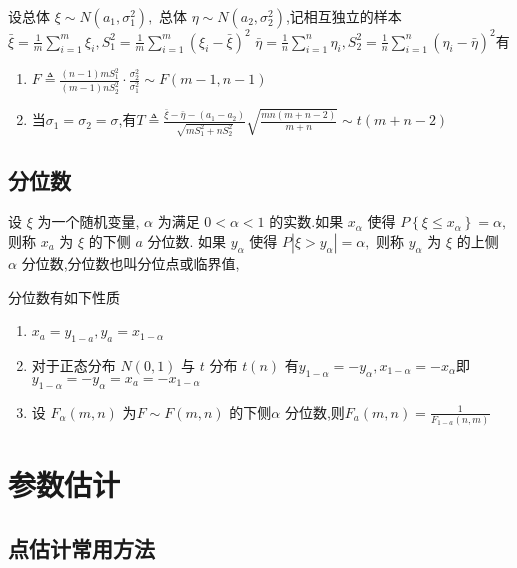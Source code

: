 \documentclass[10pt]{yerbaformat}
\begin{document}
\begin{theorem}
    设总体 $\xi \sim N\left(a_{1}, \sigma_{1}^{2}\right),$ 总体 $\eta \sim N\left(a_{2}, \sigma_{2}^{2}\right)$,记相互独立的样本$\bar{\xi}=\frac{1}{m} \sum_{i=1}^{m} \xi_{i}, S_{1}^{2}=\frac{1}{m} \sum_{i=1}^{m}\left(\xi_{i}-\bar{\xi}\right)^{2}$
    $\bar{\eta}=\frac{1}{n} \sum_{i=1}^{n} \eta_{i}, S_{2}^{2}=\frac{1}{n} \sum_{i=1}^{n}\left(\eta_{i}-\bar{\eta}\right)^{2}$有
    \begin{enumerate}
        \item $F \triangleq \frac{(n-1) m S_{1}^{2}}{(m-1) n S_{2}^{2}} \cdot \frac{\sigma_{2}^{2}}{\sigma_{1}^{2}} \sim F(m-1, n-1)$
        \item 当$\sigma_{1}=\sigma_{2}=\sigma$,有$T \triangleq \frac{\bar{\xi}-\bar{\eta}-\left(a_{1}-a_{2}\right)}{\sqrt{m S_{1}^{2}+n S_{2}^{2}}} \sqrt{\frac{m n(m+n-2)}{m+n}} \sim t(m+n-2)$
    \end{enumerate}
\end{theorem}


\subsection{分位数}
\begin{definition}
    设 $\xi$ 为一个随机变量, $\alpha$ 为满足 $0<\alpha<1$ 的实数.如果 $x_{\alpha}$ 使得 $P\left\{\xi \leqslant x_{\alpha}\right\}=\alpha,$ 则称 $x_{a}$ 为 $\xi$ 的下侧 $a$ 分位数. 如果 $y_{\alpha}$ 使得 $P\left|\xi>y_{\alpha}\right|=\alpha,$ 则称 $y_{\alpha}$ 为 $\xi$ 的上侧 $\alpha$ 分位数,分位数也叫分位点或临界值,
\end{definition}
\par 分位数有如下性质
\begin{enumerate}
    \item $x_{a}=y_{1-a}, y_{a}=x_{1-\alpha}$
    \item 对于正态分布 $N(0,1)$ 与 $t$ 分布 $t(n)$ 有$y_{1-\alpha}=-y_{\alpha}, x_{1-\alpha}=-x_{\alpha}
          $即$y_{1-\alpha}=-y_{\alpha}=x_{a}=-x_{1-\alpha}$
    \item 设 $F_{\alpha}(m, n)$ 为$F \sim F(m, n)$ 的下侧$\alpha$ 分位数,则$F_{a}(m, n)=\frac{1}{F_{1-a}(n, m)}$
\end{enumerate}

\section{参数估计}

\subsection{点估计常用方法}
\end{document}
